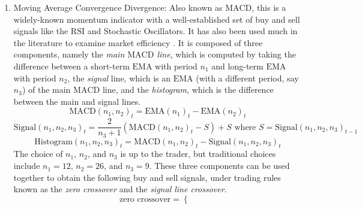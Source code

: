\documentclass[stu,floatsintext]{apa7}
\begin{document}
\begin{enumerate}
\begin{equation}\text{MA}(n)_t=\frac{1}{n}\sum_{i=0}^{n-1}p_{t-i}\end{equation}
Moving averages provide a more stable series of the closing prices, which can be used both as a technical indicator on its own and as a reference for other momentum-based technical indicators \parencite{son2012forecasting}. Another kind is the Exponential Moving Average, which, as opposed to the Simple Moving Average, gives more weight to more recent timesteps. It is computed recursively, as follows \parencite{kang2021macd}:
\begin{equation}\text{EMA}(n)_t=\frac{2}{n+1}(p_t-\text{EMA}(n)_{t-1})+\text{EMA}(n)_{t-1}\end{equation}
\item Moving Average Convergence Divergence: Also known as $\text{MACD}$, this is a widely-known momentum indicator with a well-established set of buy and sell signals like the $\text{RSI}$ and Stochastic Oscillators. It has also been used much in the literature to examine market efficiency \parencite{kang2021macd}. It is composed of three components, namely the \textit{main $\text{MACD}$ line}, which is computed by taking the difference between a short-term $\text{EMA}$ with period $n_1$ and long-term $\text{EMA}$ with period $n_2$, the \textit{signal} line, which is an $\text{EMA}$ (with a different period, say $n_3$) of the main $\text{MACD}$ line, and the \textit{histogram}, which is the difference between the main and signal lines.
\begin{equation}\text{MACD}(n_1,n_2)_t=\text{EMA}(n_1)_t-\text{EMA}(n_2)_t\end{equation}
\begin{equation}\text{Signal}(n_1,n_2,n_3)_t=\frac{2}{n_3+1}\left(\text{MACD}(n_1,n_2)_t-S\right)+S\text{ where }S=\text{Signal}(n_1,n_2,n_3)_{t-1}\end{equation}
\begin{equation}\text{Histogram}(n_1,n_2,n_3)_t=\text{MACD}(n_1,n_2)_t-\text{Signal}(n_1,n_2,n_3)_t\end{equation}
The choice of $n_1$, $n_2$, and $n_3$ is up to the trader, but traditional choices include $n_1=12$, $n_2=26$, and $n_3=9$. These three components can be used together to obtain the following buy and sell signals, under trading rules known as the \textit{zero crossover} and the \textit{signal line crossover}.
\begin{equation}\text{zero crossover}=\begin{cases}

\end{cases}
\end{equation}
\end{enumerate}
\end{document}
